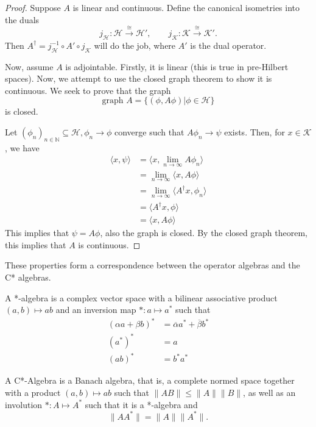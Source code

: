 \documentclass[twoside,symmetric, openany, 12pt]{./tuftebook}
\theoremstyle{definition}
\theoremstyle{definition}
\theoremstyle{definition}
\newcommand{\N}{\mathbb{N}}
\begin{document}
\begin{proof}
	Suppose $A$ is linear and continuous. Define the canonical isometries into the duals
	\[
		j_\mathcal{H}:\mathcal{H}\xrightarrow{\cong}\mathcal{H}', \qquad j_{\mathcal{K}}:\mathcal{K}\xrightarrow{\cong}\mathcal{K}'
	.\] 
	Then $A^\dagger = j_\mathcal{H}^{-1}\circ A' \circ j_{\mathcal{K}}$ will do the job, where $A'$ is the dual operator.

	Now, assume $A$ is adjointable. Firstly, it is linear (this is true in pre-Hilbert spaces). Now, we attempt to use the closed graph theorem to show it is continuous. We seek to prove that the graph
	\[
		\text{graph }A = \{(\phi, A\phi)|\phi\in \mathcal{H}\} 
	\]
	is closed.

	Let $(\phi_n)_{n\in \N}\subseteq \mathcal{H}, \phi_n \to \phi$ converge such that $A\phi_n\to \psi$ exists. Then, for $x\in \mathcal{K}$, we have
	\begin{align*}
		\langle x, \psi\rangle &= \langle x, \lim_{n\to \infty} A\phi_n\rangle \\
				       &= \lim_{n \to \infty} \langle x, A \phi\rangle\\
				       &= \lim_{n \to \infty} \langle A^\dagger x, \phi_n\rangle\\
				       &= \langle A^\dagger x, \phi\rangle \\
				       &=\langle x, A \phi\rangle
	\end{align*}
	This implies that $\psi = A \phi$, also the graph is closed. By the closed graph theorem, this implies that $A$ is continuous.
\end{proof}
These properties form a correspondence between the operator algebras and the C* algebras.
\begin{Definition}[*-Algebra]
	A *-algebra is a complex vector space with a bilinear associative product $(a,b) \mapsto ab$ and an inversion map $*:a\mapsto a^*$ such that
	\begin{align*}
		(\alpha a + \beta b)^* &= \overline{\alpha}a^* + \overline{\beta}b^*\\
		(a^*)^*&=a\\
		(ab)^* &= b^*a^*
	\end{align*}
\end{Definition}
\begin{Definition}[C*-Algebra]
	A C*-Algebra is a Banach algebra, that is, a complete normed space together with a product $(a, b)\mapsto ab$ such that $\|AB\|\le \|A\|\|B\|$, as well as an involution $*:A\mapsto A^*$ such that it is a *-algebra and 
	\[
\|A A^*\|= \|A\|\|A^*\|
	.\] 
\end{Definition}
\end{document}
